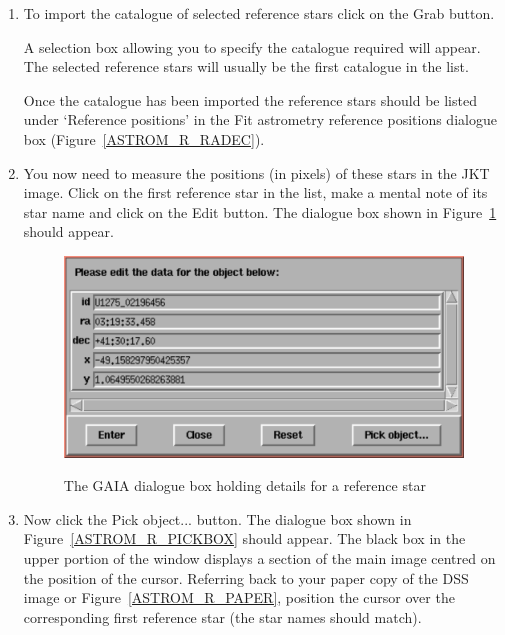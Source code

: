 \documentclass[twoside,11pt]{starlink}
\begin{document}
\begin{enumerate}
  \item To import the catalogue of selected reference stars click on the
   \textsf{Grab} button.

   A selection box allowing you to specify the catalogue required will
   appear.  The selected reference stars will usually be the first
   catalogue in the list.

   Once the catalogue has been imported the reference stars should be
   listed under `Reference positions' in the \textsf{Fit astrometry reference
   positions} dialogue box (Figure~\ref{ASTROM_R_RADEC}).

  \item You now need to measure the positions (in pixels) of these stars
   in the JKT image.  Click on the first reference star in the list, make
   a mental note of its star name and click on the \textsf{Edit} button.
   The dialogue box shown in Figure~\ref{ASTROM_R_REFPOS} should appear.

  \begin{figure}[htbp]
     \centering
     \includegraphics[totalheight=1.5in]{sc17_astrom_r_refpos}
     \begin{quote}
     \caption{The GAIA dialogue box holding details for a reference star
     \label{ASTROM_R_REFPOS} }
     \end{quote}
  \end{figure}

  \item Now click the \textsf{Pick object...} button.   The dialogue box
   shown in Figure~\ref{ASTROM_R_PICKBOX} should appear.  The black box
   in the upper portion of the window displays a section of the main image
   centred on the position of the cursor.  Referring back to your paper
   copy of the DSS image or Figure~\ref{ASTROM_R_PAPER}, position the
   cursor over the corresponding first reference star (the star names
   should match).


\end{enumerate}
\end{document}

